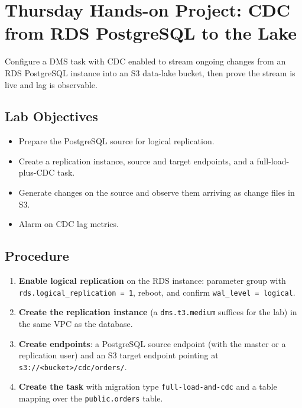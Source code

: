 \section{Thursday Hands-on Project: CDC from RDS PostgreSQL to the Lake}
Configure a DMS task with CDC enabled to stream ongoing changes from an RDS PostgreSQL instance into an S3 data-lake bucket, then prove the stream is live and lag is observable.

\subsection*{Lab Objectives}
\begin{itemize}
    \item Prepare the PostgreSQL source for logical replication.
    \item Create a replication instance, source and target endpoints, and a full-load-plus-CDC task.
    \item Generate changes on the source and observe them arriving as change files in S3.
    \item Alarm on CDC lag metrics.
\end{itemize}

\subsection*{Procedure}
\begin{enumerate}
    \item \textbf{Enable logical replication} on the RDS instance: parameter group with \texttt{rds.logical\_replication = 1}, reboot, and confirm \texttt{wal\_level = logical}.
    \item \textbf{Create the replication instance} (a \texttt{dms.t3.medium} suffices for the lab) in the same VPC as the database.
    \item \textbf{Create endpoints}: a PostgreSQL source endpoint (with the master or a replication user) and an S3 target endpoint pointing at \texttt{s3://<bucket>/cdc/orders/}.
    \item \textbf{Create the task} with migration type \texttt{full-load-and-cdc} and a table mapping over the \texttt{public.orders} table.
\end{enumerate}

